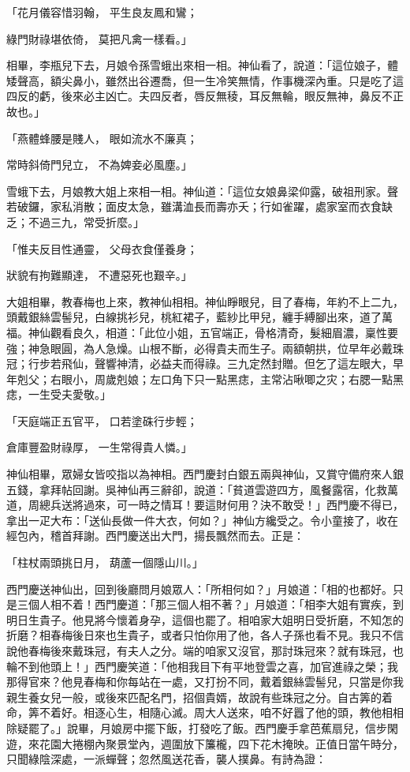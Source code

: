 \begin{showcontents}{}
「花月儀容惜羽翰，  平生良友鳳和鸞；

綠門財祿堪依倚，  莫把凡禽一樣看。」

相畢，李瓶兒下去，月娘令孫雪蛾出來相一相。神仙看了，說道：「這位娘子，體矮聲高，額尖鼻小，雖然出谷遷喬，但一生冷笑無情，作事機深內重。只是吃了這四反的虧，後來必主凶亡。夫四反者，唇反無稜，耳反無輪，眼反無神，鼻反不正故也。」

「燕體蜂腰是賤人，  眼如流水不廉真；

常時斜倚門兒立，  不為婢妾必風塵。」

雪蛾下去，月娘教大姐上來相一相。神仙道：「這位女娘鼻梁仰露，破祖刑家。聲若破鑼，家私消散；面皮太急，雖溝洫長而壽亦夭；行如雀躍，處家室而衣食缺乏；不過三九，常受折麼。」

「惟夫反目性通靈，  父母衣食僅養身；

狀貌有拘難顯達，  不遭惡死也艱辛。」

大姐相畢，教春梅也上來，教神仙相相。神仙睜眼兒，目了春梅，年約不上二九，頭戴銀絲雲髻兒，白線挑衫兒，桃紅裙子，藍紗比甲兒，纏手縛腳出來，道了萬福。神仙觀看良久，相道：「此位小姐，五官端正，骨格清奇，髮細眉濃，稟性要強；神急眼圓，為人急燥。山根不斷，必得貴夫而生子。兩額朝拱，位早年必戴珠冠；行步若飛仙，聲響神清，必益夫而得祿。三九定然封贈。但乞了這左眼大，早年剋父；右眼小，周歲剋娘；左口角下只一點黑痣，主常沾啾唧之灾；右腮一點黑痣，一生受夫愛敬。」

「天庭端正五官平，  口若塗硃行步輕；

倉庫豐盈財祿厚，  一生常得貴人憐。」

神仙相畢，眾婦女皆咬指以為神相。西門慶封白銀五兩與神仙，又賞守備府來人銀五錢，拿拜帖回謝。吳神仙再三辭卻，說道：「貧道雲遊四方，風餐露宿，化救萬道，周總兵送將過來，可一時之情耳！要這財何用？決不敢受！」西門慶不得已，拿出一疋大布：「送仙長做一件大衣，何如？」神仙方纔受之。令小童接了，收在經包內，稽首拜謝。西門慶送出大門，揚長飄然而去。正是：

「柱杖兩頭挑日月，  葫蘆一個隱山川。」

西門慶送神仙出，回到後廳問月娘眾人：「所相何如？」月娘道：「相的也都好。只是三個人相不着！西門慶道：「那三個人相不著？」月娘道：「相李大姐有實疾，到明日生貴子。他見將今懷着身孕，這個也罷了。相咱家大姐明日受折磨，不知怎的折磨？相春梅後日來也生貴子，或者只怕你用了他，各人子孫也看不見。我只不信說他春梅後來戴珠冠，有夫人之分。端的咱家又沒官，那討珠冠來？就有珠冠，也輪不到他頭上！」西門慶笑道：「他相我目下有平地登雲之喜，加官進祿之榮；我那得官來？他見春梅和你每站在一處，又打扮不同，戴着銀絲雲髻兒，只當是你我親生養女兒一般，或後來匹配名門，招個貴婿，故說有些珠冠之分。自古筭的着命，筭不着好。相逐心生，相隨心滅。周大人送來，咱不好囂了他的頭，教他相相除疑罷了。」說畢，月娘房中擺下飯，打發吃了飯。西門慶手拿芭蕉扇兒，信步閑遊，來花園大捲棚內聚景堂內，週圍放下簾櫳，四下花木掩映。正值日當午時分，只聞綠陰深處，一派蟬聲；忽然風送花香，襲人撲鼻。有詩為證：


\end{showcontents}
